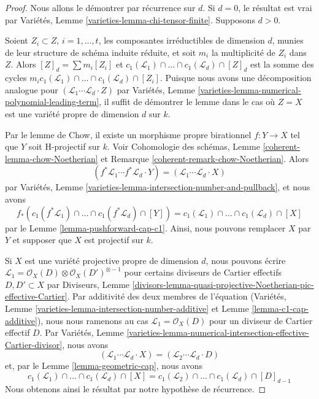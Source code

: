 \begin{proof}
Nous allons le démontrer par récurrence sur $d$. Si $d = 0$, le résultat est
vrai par Variétés, Lemme \ref{varieties-lemma-chi-tensor-finite}.
Supposons $d > 0$.

\medskip\noindent
Soient $Z_i \subset Z$, $i = 1, \ldots, t$, les composantes irréductibles
de dimension $d$, munies de leur structure de schéma induite réduite, et soit $m_i$ la
multiplicité de $Z_i$ dans $Z$. Alors $[Z]_d = \sum m_i[Z_i]$ et
$c_1(\mathcal{L}_1) \cap \ldots \cap c_1(\mathcal{L}_d) \cap [Z]_d$
est la somme des cycles
$m_i c_1(\mathcal{L}_1) \cap \ldots \cap c_1(\mathcal{L}_d) \cap [Z_i]$.
Puisque nous avons une décomposition analogue pour
$(\mathcal{L}_1 \cdots \mathcal{L}_d \cdot Z)$ par
Variétés, Lemme \ref{varieties-lemma-numerical-polynomial-leading-term},
il suffit de démontrer le lemme dans le cas où $Z = X$
est une variété propre de dimension $d$ sur $k$.

\medskip\noindent
Par le lemme de Chow, il existe un morphisme propre birationnel $f : Y \to X$
tel que $Y$ soit H-projectif sur $k$. Voir Cohomologie des schémas, Lemme
\ref{coherent-lemma-chow-Noetherian} et Remarque
\ref{coherent-remark-chow-Noetherian}. Alors
$$
(f^*\mathcal{L}_1 \cdots f^*\mathcal{L}_d \cdot Y) =
(\mathcal{L}_1 \cdots \mathcal{L}_d \cdot X)
$$
par Variétés, Lemme \ref{varieties-lemma-intersection-number-and-pullback},
et nous avons
$$
f_*(c_1(f^*\mathcal{L}_1) \cap \ldots \cap c_1(f^*\mathcal{L}_d) \cap [Y]) =
c_1(\mathcal{L}_1) \cap \ldots \cap c_1(\mathcal{L}_d) \cap [X]
$$
par le Lemme \ref{lemma-pushforward-cap-c1}. Ainsi, nous pouvons remplacer $X$ par $Y$
et supposer que $X$ est projectif sur $k$.

\medskip\noindent
Si $X$ est une variété projective propre de dimension $d$, nous pouvons
écrire $\mathcal{L}_1 = \mathcal{O}_X(D) \otimes \mathcal{O}_X(D')^{\otimes -1}$
pour certains diviseurs de Cartier effectifs $D, D' \subset X$
par Diviseurs, Lemme
\ref{divisors-lemma-quasi-projective-Noetherian-pic-effective-Cartier}.
Par additivité des deux membres de l'équation
(Variétés, Lemme \ref{varieties-lemma-intersection-number-additive} et
Lemme \ref{lemma-c1-cap-additive}),
nous nous ramenons au cas $\mathcal{L}_1 = \mathcal{O}_X(D)$ pour un
diviseur de Cartier effectif $D$.
Par Variétés, Lemme
\ref{varieties-lemma-numerical-intersection-effective-Cartier-divisor},
nous avons
$$
(\mathcal{L}_1 \cdots \mathcal{L}_d \cdot X) =
(\mathcal{L}_2 \cdots \mathcal{L}_d \cdot D)
$$
et, par le Lemme \ref{lemma-geometric-cap}, nous avons
$$
c_1(\mathcal{L}_1) \cap \ldots \cap c_1(\mathcal{L}_d) \cap [X] =
c_1(\mathcal{L}_2) \cap \ldots \cap c_1(\mathcal{L}_d) \cap [D]_{d - 1}
$$
Nous obtenons ainsi le résultat par notre hypothèse de récurrence.
\end{proof}








